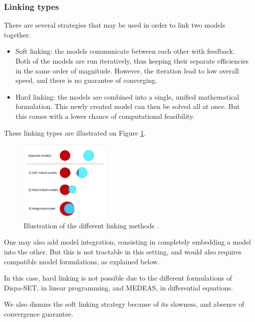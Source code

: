\subsubsection{Linking types}

There are several strategies that may be used in order to link two models together.

\begin{itemize}
    \item Soft linking: the models communicate between each other with feedback. Both of the models are run iteratively, thus keeping their separate efficiencies in the same order of magnitude. However, the iteration lead to low overall speed, and there is no guarantee of converging.
    \item Hard linking: the models are combined into a single, unified mathematical formulation. This newly created model can then be solved all at once. But this comes with a lower chance of computational feasibility.
\end{itemize}

These linking types are illustrated on Figure \ref{fig:linking-types}.

\begin{figure}[h]
    \centering
    \includegraphics[width=0.4\textwidth]{resources/images/hybrid_model_variants.png}
    \caption{Illustration of the different linking methods \cite{hybrid_models}.}
    \label{fig:linking-types}
\end{figure}

One may also add model integration, consisting in completely embedding a model into the other. But this is not tractable in this setting, and would also requires compatible model formulations, as explained below.

In this case, hard linking is not possible due to the different formulations of Dispa-SET, in linear programming, and MEDEAS, in differential equations.

We also dismiss the soft linking strategy because of its slowness, and absence of convergence guarantee.

